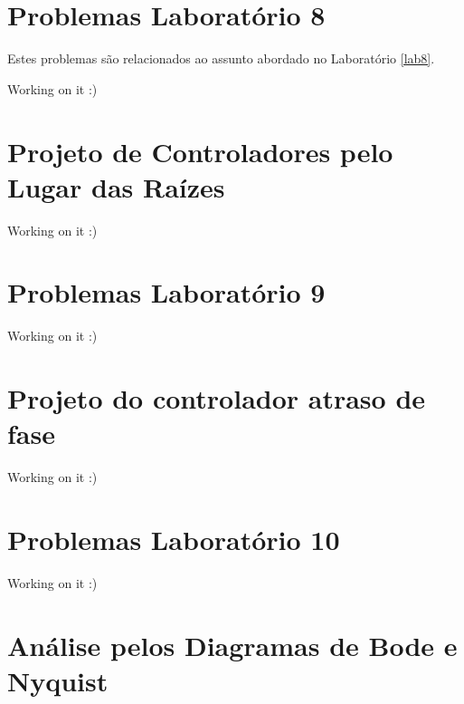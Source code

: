 \documentclass[
]{book}
\theoremstyle{definition}
\theoremstyle{definition}
\theoremstyle{definition}
\theoremstyle{remark}
\begin{document}
\hypertarget{problemas-laboratuxf3rio-8}{%
\chapter*{Problemas Laboratório 8}\label{problemas-laboratuxf3rio-8}}

Estes problemas são relacionados ao assunto abordado no Laboratório \ref{lab8}.

Working on it :)

\hypertarget{projeto-de-controladores-pelo-lugar-das-rauxedzes}{%
\chapter{Projeto de Controladores pelo Lugar das Raízes}\label{projeto-de-controladores-pelo-lugar-das-rauxedzes}}

Working on it :)

\hypertarget{problemas-laboratuxf3rio-9}{%
\chapter*{Problemas Laboratório 9}\label{problemas-laboratuxf3rio-9}}

Working on it :)

\hypertarget{projeto-do-controlador-atraso-de-fase}{%
\chapter{Projeto do controlador atraso de fase}\label{projeto-do-controlador-atraso-de-fase}}

Working on it :)

\hypertarget{problemas-laboratuxf3rio-10}{%
\chapter*{Problemas Laboratório 10}\label{problemas-laboratuxf3rio-10}}

Working on it :)

\hypertarget{anuxe1lise-pelos-diagramas-de-bode-e-nyquist}{%
\chapter{Análise pelos Diagramas de Bode e Nyquist}\label{anuxe1lise-pelos-diagramas-de-bode-e-nyquist}}
\end{document}
